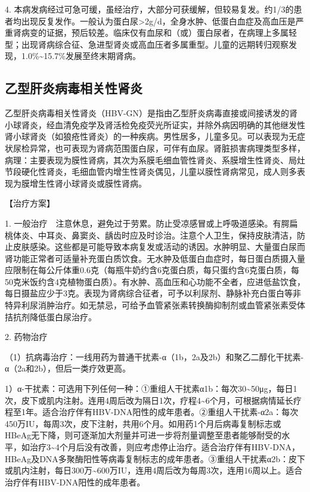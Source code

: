 4.
本病发病经过可急可缓，虽经治疗，大部分可获缓解，但较易复发。约1/3的患者均出现反复发作。一般认为蛋白尿\textgreater{}2g/d，全身水肿、低蛋白血症及高血压是严重肾病变的证据，预后较差。临床仅有血尿和（或）蛋白尿者，在病理上多属轻型；出现肾病综合征、急进型肾炎或高血压者多属重型。儿童的远期转归观察发现，1.0\%\textasciitilde{}15.7\%发展至终末期肾病。

\subsection{乙型肝炎病毒相关性肾炎}

乙型肝炎病毒相关性肾炎（HBV-GN）是指由乙型肝炎病毒直接或间接诱发的肾小球肾炎，经血清免疫学及肾活检免疫荧光所证实，并除外病因明确的其他继发性肾小球肾炎（如狼疮性肾炎）的一种疾病。男性居多，儿童多见。可以表现为无症状尿检异常，也可表现为肾病范围蛋白尿，可伴有血尿。肾脏损害病理类型多样，病理：主要表现为膜性肾病，其次为系膜毛细血管性肾炎、系膜增生性肾炎、局灶节段硬化性肾炎，毛细血管内增生性肾炎偶见，儿童以膜性肾病常见，成人则多表现为膜增生性肾小球肾炎或膜性肾病。

【治疗方案】

1.
一般治疗　注意休息，避免过于劳累。防止受凉感冒或上呼吸道感染。有腭扁桃体炎、中耳炎、鼻窦炎、龋齿时应及时诊治。注意个人卫生，保持皮肤清洁，防止皮肤感染。这些都是可能导致本病复发或活动的诱因。水肿明显、大量蛋白尿而肾功能正常者可适量补充蛋白质饮食。无水肿及低蛋白血症时，每日蛋白质摄入量应限制在每公斤体重0.6克（每瓶牛奶约含6克蛋白质，每只蛋约含6克蛋白质，每50克米饭约含4克植物蛋白质）。有水肿、高血压和心功能不全者，应进低盐饮食，每日摄盐应少于3克。表现为肾病综合征者，可予以利尿剂、静脉补充白蛋白等非特异利尿消肿治疗。如无禁忌，可给予血管紧张素转换酶抑制剂或血管紧张素受体拮抗剂降低蛋白尿治疗。

2. 药物治疗

（1）抗病毒治疗：一线用药为普通干扰素-α（1b，2a及2b）和聚乙二醇化干扰素-α（2a和2b），但后一类疗效更高。

1）α-干扰素：可选用下列任何一种：①重组人干扰素α1b：每次30\textasciitilde{}50μg，每日1次，皮下或肌内注射。连用4周后改为隔日1次，疗程4\textasciitilde{}6个月，可根据病情延长疗程至1年。适合治疗伴有HBV-DNA阳性的成年患者。②重组人干扰素-α2a：每次450万IU，每周3次，皮下注射，共用6个月。如用药1个月后病毒复制标志或HBeAg无下降，则可逐渐加大剂量并可进一步将剂量调整至患者能够耐受的水平，如治疗3\textasciitilde{}4个月后没有改善，则应考虑停止治疗。适合治疗伴有HBV-DNA，HBeAg及DNA多聚酶阳性等病毒复制标志的成年患者。③重组人干扰素α2b：皮下或肌内注射，每日300万\textasciitilde{}600万IU，连用4周后改为每周3次，连用16周以上。适合治疗伴有HBV-DNA阳性的成年患者。

